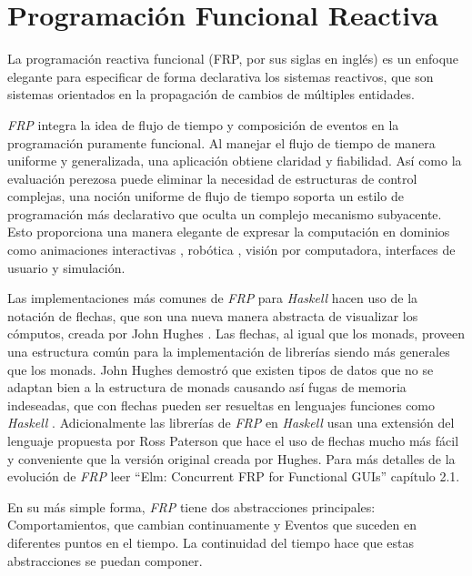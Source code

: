 
\section{Programación Funcional Reactiva}  %

\ifpdf
    \graphicspath{{FRP/Figs/Raster/}{FRP/Figs/PDF/}{FRP/Figs/}}
\else
    \graphicspath{{FRP/Figs/Vector/}{FRP/Figs/}}
\fi

La programación reactiva funcional (FRP, por sus siglas en inglés) es un enfoque elegante para especificar de forma declarativa los sistemas reactivos, que son sistemas orientados en la propagación de cambios de múltiples entidades.

\emph{FRP} integra la idea de flujo de tiempo y composición de eventos en la programación puramente funcional. Al manejar el flujo de tiempo de manera uniforme y generalizada, una aplicación obtiene claridad y fiabilidad. Así como la evaluación perezosa puede eliminar la necesidad de estructuras de control complejas, una noción uniforme de flujo de tiempo soporta un estilo de programación más declarativo que oculta un complejo mecanismo subyacente. Esto proporciona una manera elegante de expresar la computación en dominios como animaciones interactivas \cite{eh97:fran}, robótica \cite{Pembeci:2002:FRR:571157.571174}, visión por computadora, interfaces de usuario \cite{czaplicki2012elm} y simulación.

Las implementaciones más comunes de \emph{FRP} para \emph{Haskell}  hacen uso de la notación de flechas, que son una nueva manera abstracta de visualizar los cómputos, creada por John Hughes \cite{hughes2000generalising}. Las flechas, al igual que los monads, proveen una estructura común para la implementación de librerías siendo más generales que los monads. John Hughes demostró que existen tipos de datos que no se adaptan bien a la estructura de monads causando así fugas de memoria indeseadas, que con flechas pueden ser resueltas en lenguajes funciones como \emph{Haskell} \cite{hughes2000generalising}. Adicionalmente las librerías de \emph{FRP} en \emph{Haskell} usan una extensión del lenguaje propuesta por Ross  Paterson \cite{paterson2001new} que hace el uso de flechas mucho más fácil y conveniente que la versión original creada por Hughes. Para más detalles de la evolución de \emph{FRP} leer ``Elm: Concurrent FRP for Functional GUIs'' \cite{czaplicki2012elm} capítulo 2.1.

En su más simple forma, \emph{FRP} tiene dos abstracciones principales: Comportamientos, que cambian continuamente y Eventos que suceden en diferentes puntos en el tiempo. La continuidad del tiempo hace que estas abstracciones se puedan componer.

